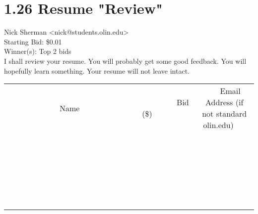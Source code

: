 \documentclass[11pt]{article}
\begin{document}
					\section*{1.26 Resume "Review"}
					Nick Sherman <nick@students.olin.edu> \\
					Starting Bid: \$0.01 \\
					Winner(s): Top 2 bids \\
					I shall review your resume. You will probably get some good feedback. You will hopefully learn something. Your resume will not leave intact. \\
					[6ex]
					\begin{tabular}{c c c}
						~~~~~~~~~~~~~Name~~~~~~~~~~~~~ & ~~~~~~~~~Bid (\$)~~~~~~~~~ & ~~~Email Address (if not standard olin.edu)~~~ \\
				
 & & \\
\hline
 & & \\
\hline
 & & \\
\hline
 & & \\
\hline
 & & \\
\hline
 & & \\
\hline
 & & \\
\hline
 & & \\
\hline
 & & \\
\hline
 & & \\
\hline
 & & \\
\hline
 & & \\
\hline
 & & \\
\hline
 & & \\
\hline
 & & \\
\hline
 & & \\
\hline
 & & \\
\hline
 & & \\
\hline
 & & \\
\hline
 & & \\
\hline
 & & \\
\hline
 & & \\
\hline
 & & \\
\hline
 & & \\
\hline
 & & \\
\hline
 & & \\
\hline
					\end{tabular}
					\clearpage
				
\end{document}
